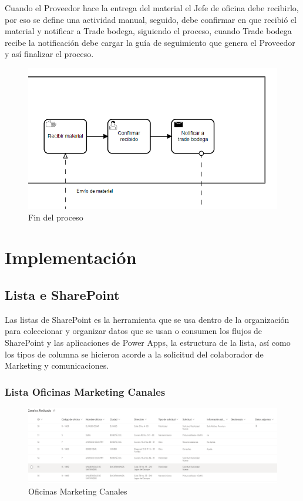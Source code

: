 Cuando el Proveedor hace la entrega del material el Jefe de oficina debe recibirlo, por eso se define una actividad manual, seguido, debe confirmar en que recibió el material y notificar a Trade bodega, siguiendo el proceso, cuando Trade bodega recibe la notificación debe cargar la guía de seguimiento que genera el Proveedor y así finalizar el proceso.

\begin{figure}[H]
	\centering
	\includegraphics[scale=0.5]{Capitulo4/imagenes/9.png}
	\caption{Fin del proceso}
	\label{Finproc}
\end{figure}

\section{Implementación}
\subsection{Lista e SharePoint}\label{listasSp}
Las listas de SharePoint es la herramienta que se usa dentro de la organización para coleccionar y organizar datos que se usan o consumen los flujos de SharePoint y las aplicaciones de Power Apps, la estructura de la lista, así como los tipos de columna se hicieron acorde a la solicitud del colaborador de Marketing y comunicaciones.
\subsubsection{Lista Oficinas Marketing Canales}
\begin{figure}[H]
	\centering
	\includegraphics[scale=0.37]{Capitulo4/imagenes/12.png}
	\caption{Oficinas Marketing Canales}
	\label{OMC}
\end{figure}

